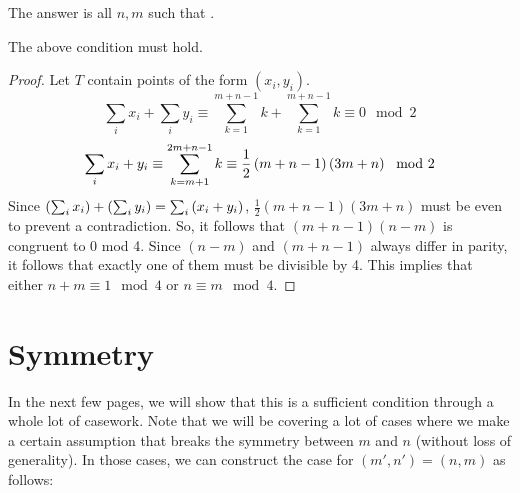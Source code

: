 \documentclass[10pt]{../usamts}
\begin{document}
\begin{solution}
The answer is all $n,m$ such that .

\begin{claim}
    The above condition must hold.
\end{claim}
\begin{proof}
    Let $T$ contain points of the form $(x_i,y_i)$.
    $$\sum_i x_i + \sum_i y_i \equiv \sum_{k=1}^{m+n-1} k + \sum_{k=1}^{m+n-1} k \equiv 0 \mod 2$$
    $$\sum_i x_i + y_i \equiv \sum_{k=m+1}^{2m+n-1} k \equiv \frac{1}{2} \left( m+n-1 \right)\left( 3m+n \right) \mod 2$$
    Since $\left( \sum_i x_i \right) + \left( \sum_i y_i \right) = \sum_i \left( x_i+y_i \right)$, $\frac{1}{2} (m+n-1)(3m+n)$ must be even to prevent a contradiction.
    So, it follows that $(m+n-1)(n-m)$ is congruent to 0 mod 4. Since $(n-m)$ and $(m+n-1)$ always differ in parity, it follows that exactly one of them must be divisible by 4. This implies that either $n+m \equiv 1 \mod 4$ or $n \equiv m \mod 4$.
\end{proof}

\newcommand{\mainaxis}{
    Select the points on the main axis so that each diagonal intersects exactly one point:
    \begin{enumerate}
        \item Select all the points of the form $(m, m+2k-1)$ for $1 \leq k \leq \floor{\frac{n}{2}}$
        \item Select all the points of the form $(m, m-2k)$ for $1 \leq k \leq \floor{\frac{m-1}{2}}$
        \item Select all the points of the form $(m+2k, m)$ for $1 \leq k \leq \floor{\frac{n-1}{2}}$
        \item Select all the points of the form $(m-2k+1, m)$ for $1 \leq k \leq \floor{\frac{m}{2}}$
    \end{enumerate}
}

\section*{Symmetry}

In the next few pages, we will show that this is a sufficient condition through a whole lot of casework. Note that we will be covering a lot of cases where we make a certain assumption that breaks the symmetry between $m$ and $n$ (without loss of generality). In those cases, we can construct the case for $(m',n') = (n,m)$ as follows:


\end{solution}
\end{document}

